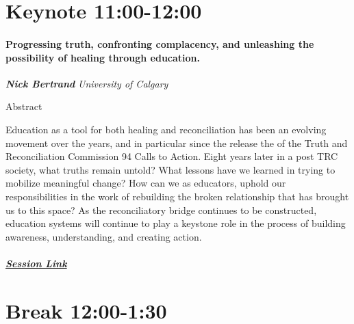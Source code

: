 \documentclass[
]{book}
\begin{document}
\hypertarget{keynote-1100-1200-1}{%
\section*{Keynote \textbar{} 11:00-12:00}\label{keynote-1100-1200-1}}

\begin{keynote}
\hypertarget{progressing-truth-confronting-complacency-and-unleashing-the-possibility-of-healing-through-education.}{%
\paragraph*{Progressing truth, confronting complacency, and unleashing
the possibility of healing through
education.}\label{progressing-truth-confronting-complacency-and-unleashing-the-possibility-of-healing-through-education.}}

\textbf{\emph{Nick Bertrand}} \textbar{} \emph{University of Calgary}

Abstract

Education as a tool for both healing and reconciliation has been an
evolving movement over the years, and in particular since the release
the of the Truth and Reconciliation Commission 94 Calls to Action. Eight
years later in a post TRC society, what truths remain untold? What
lessons have we learned in trying to mobilize meaningful change? How can
we as educators, uphold our responsibilities in the work of rebuilding
the broken relationship that has brought us to this space? As the
reconciliatory bridge continues to be constructed, education systems
will continue to play a keystone role in the process of building
awareness, understanding, and creating action.

\hypertarget{session-link}{%
\subparagraph*{\texorpdfstring{\href{}{Session
Link}}{Session Link}}\label{session-link}}
\end{keynote}

\hypertarget{break-1200-130-1}{%
\section*{Break \textbar{} 12:00-1:30}\label{break-1200-130-1}}
\end{document}
